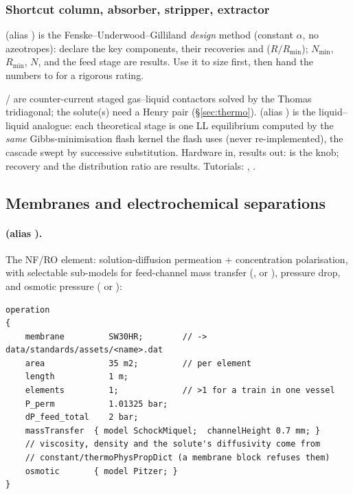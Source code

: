 \documentclass[11pt,a4paper]{article}
\begin{document}
\subsubsection{Shortcut column, absorber, stripper, extractor}

 (alias ) is the
Fenske--Underwood--Gilliland \emph{design} method (constant $\alpha$,
no azeotropes): declare the key components, their recoveries and
 ($R/R_{\min}$); $N_{\min}$, $R_{\min}$, $N$, and
the feed stage are results.  Use it to size first, then hand the
numbers to  for a rigorous rating.

 /  are counter-current staged
gas--liquid contactors solved by the Thomas tridiagonal; the solute(s)
need a Henry pair (\S\ref{sec:thermo}).   (alias
) is the liquid--liquid analogue: each theoretical stage
is one LL equilibrium computed by the \emph{same} Gibbs-minimisation
flash kernel the flash uses (never re-implemented), the cascade swept
by successive substitution.  Hardware in, results out: 
is the knob; recovery and the distribution ratio are results.
Tutorials: ,
.

\subsection{Membranes and electrochemical separations}\label{sec:membranes}

\paragraph{ (alias ).}  The
NF/RO element: solution-diffusion permeation + concentration
polarisation, with selectable sub-models for feed-channel mass transfer
(,  or ), pressure
drop, and osmotic pressure ( or ):

\begin{lstlisting}[language=dict]
operation
{
    membrane         SW30HR;        // -> data/standards/assets/<name>.dat
    area             35 m2;         // per element
    length           1 m;
    elements         1;             // >1 for a train in one vessel
    P_perm           1.01325 bar;
    dP_feed_total    2 bar;
    massTransfer  { model SchockMiquel;  channelHeight 0.7 mm; }
    // viscosity, density and the solute's diffusivity come from
    // constant/thermoPhysPropDict (a membrane block refuses them)
    osmotic       { model Pitzer; }
}
\end{lstlisting}
\end{document}
